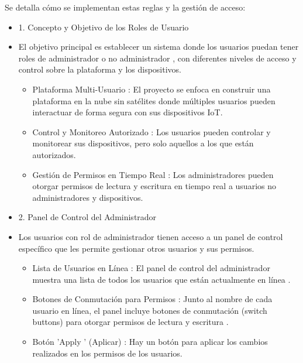 \documentclass{report}
\begin{document}
Se detalla cómo se implementan estas reglas y la gestión de acceso:
\begin{itemize}
    \item 1. Concepto y Objetivo de los Roles de Usuario
    \item El objetivo principal es establecer un sistema donde los  usuarios puedan tener roles de administrador o no administrador , con diferentes 
    niveles de acceso y control sobre la plataforma y los dispositivos.
    \begin{itemize}
        \item Plataforma Multi-Usuario : El proyecto se enfoca en construir una plataforma en la nube sin satélites donde múltiples usuarios pueden 
        interactuar de forma segura con sus dispositivos IoT.
        \item Control y Monitoreo Autorizado : Los usuarios pueden controlar y monitorear sus dispositivos, pero solo aquellos a los que están 
        autorizados.
        \item Gestión de Permisos en Tiempo Real : Los administradores pueden otorgar permisos de lectura y escritura en tiempo real a usuarios 
        no administradores y dispositivos.
    \end{itemize}

    \item 2. Panel de Control del Administrador
    \item Los usuarios con rol de administrador tienen acceso a un panel de control específico que les permite gestionar otros usuarios y sus permisos.
    \begin{itemize}
        \item Lista de Usuarios en Línea : El panel de control del administrador muestra una  lista de todos los usuarios que están actualmente en línea .
        \item Botones de Conmutación para Permisos : Junto al nombre de cada usuario en línea, el panel incluye  botones de conmutación (switch buttons) 
        para otorgar permisos de lectura y escritura .
        \item Botón  'Apply ' (Aplicar) : Hay un botón para aplicar los cambios realizados en los permisos de los usuarios.
    \end{itemize}


\end{itemize}
\end{document}
